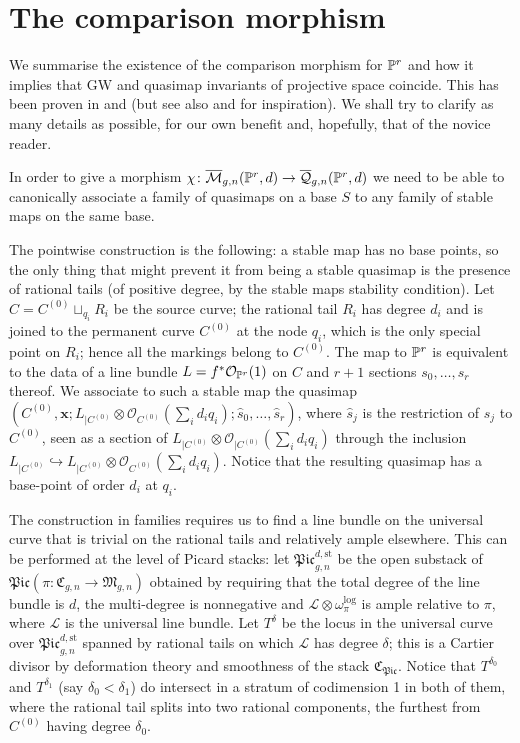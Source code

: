\section{The comparison morphism} \label{Section comparison morphism}

We summarise the existence of the comparison morphism for $\mathbb P^r$ and how it implies that GW and quasimap invariants of projective space coincide. This has been proven in \cite[Theorem 3]{MOP} and \cite[Section 4.3]{Manolache-Push} (but see also \cite[Proposition 4.1]{Bertram} and \cite[Theorem 7.1]{Popa-Roth} for inspiration). We shall try to clarify as many details as possible, for our own benefit and, hopefully, that of the novice reader.

In order to give a morphism $\chi\colon\overline{\mathcal M}_{g,n}(\mathbb P^r,d)\rightarrow\overline{\mathcal Q}_{g,n}(\mathbb P^r,d)$ we need to be able to canonically associate a family of quasimaps on a base $S$ to any family of stable maps on the same base.

The pointwise construction is the following: a stable map has no base points, so the only thing that might prevent it from being a stable quasimap is the presence of rational tails (of positive degree, by the stable maps stability condition). Let $C=C^{(0)}\sqcup_{q_i}R_i$ be the source curve; the rational tail $R_i$ has degree $d_i$ and is joined to the permanent curve $C^{(0)}$ at the node $q_i$, which is the only special point on $R_i$; hence all the markings belong to $C^{(0)}$. The map to $\mathbb P^r$ is equivalent to the data of a line bundle $L=f^*\mathcal O_{\mathbb P^r}(1)$ on $C$ and $r+1$ sections $s_0,\ldots,s_r$ thereof. We associate to such a stable map the quasimap $(C^{(0)},\mathbf x; L_{|C^{(0)}}\otimes\mathcal O_{C^{(0)}}(\sum_{i}d_iq_i);\hat s_0,\ldots,\hat s_r)$, where $\hat s_j$ is the restriction of $s_j$ to $C^{(0)}$, seen as a section of $L_{|C^{(0)}}\otimes\mathcal O_{|C^{(0)}}(\sum_{i}d_iq_i)$ through the inclusion $L_{|C^{(0)}}\hookrightarrow L_{|C^{(0)}}\otimes\mathcal O_{C^{(0)}}(\sum_{i}d_iq_i)$. Notice that the resulting quasimap has a base-point of order $d_i$ at $q_i$.

The construction in families requires us to find a line bundle on the universal curve that is trivial on the rational tails and relatively ample elsewhere. This can be performed at the level of Picard stacks: let $\mathfrak{Pic}_{g,n}^{d,\text{st}}$ be the open substack of $\mathfrak{Pic}(\pi\colon\mathfrak{C}_{g,n}\to\mathfrak{M}_{g,n})$ obtained by requiring that the total degree of the line bundle is $d$, the multi-degree is nonnegative and $\mathcal L\otimes\omega_{\pi}^{\text{log}}$ is ample relative to $\pi$, where $\mathcal L$ is the universal line bundle. Let $T^{\delta}$ be the locus in the universal curve over $\mathfrak{Pic}_{g,n}^{d,\text{st}}$ spanned by rational tails on which $\mathcal L$ has degree $\delta$; this is a Cartier divisor by deformation theory and smoothness of the stack $\mathfrak{C}_{\mathfrak{Pic}}$. Notice that $T^{\delta_0}$ and $T^{\delta_1}$ (say $\delta_0<\delta_1$) do intersect in a stratum of codimension 1 in both of them, where the rational tail splits into two rational components, the furthest from $C^{(0)}$ having degree $\delta_0$.

